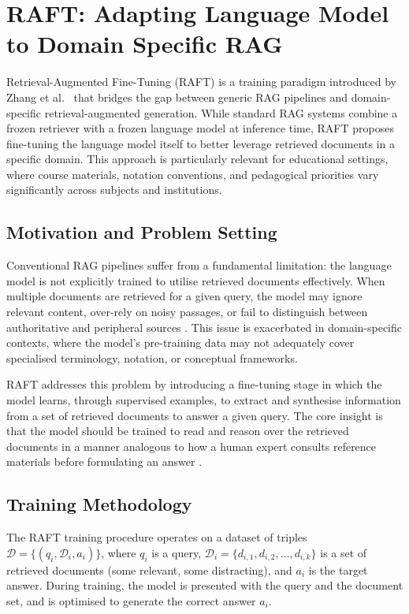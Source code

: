 \section{RAFT: Adapting Language Model to Domain Specific RAG}

Retrieval-Augmented Fine-Tuning (RAFT) is a training paradigm introduced by Zhang et al.\ \cite{zhang2024raftadaptinglanguagemodel} that bridges the gap between generic RAG pipelines and domain-specific retrieval-augmented generation. While standard RAG systems combine a frozen retriever with a frozen language model at inference time, RAFT proposes fine-tuning the language model itself to better leverage retrieved documents in a specific domain. This approach is particularly relevant for educational settings, where course materials, notation conventions, and pedagogical priorities vary significantly across subjects and institutions.

\subsection{Motivation and Problem Setting}

Conventional RAG pipelines suffer from a fundamental limitation: the language model is not explicitly trained to utilise retrieved documents effectively. When multiple documents are retrieved for a given query, the model may ignore relevant content, over-rely on noisy passages, or fail to distinguish between authoritative and peripheral sources \cite{gao2023retrieval}. This issue is exacerbated in domain-specific contexts, where the model's pre-training data may not adequately cover specialised terminology, notation, or conceptual frameworks.

RAFT addresses this problem by introducing a fine-tuning stage in which the model learns, through supervised examples, to extract and synthesise information from a set of retrieved documents to answer a given query. The core insight is that the model should be trained to read and reason over the retrieved documents in a manner analogous to how a human expert consults reference materials before formulating an answer \cite{zhang2024raft}.

\subsection{Training Methodology}

The RAFT training procedure operates on a dataset of triples \(\mathcal{D} = \{(q_i, \mathcal{D}_i, a_i)\}\), where \(q_i\) is a query, \(\mathcal{D}_i = \{d_{i,1}, d_{i,2}, \dots, d_{i,k}\}\) is a set of retrieved documents (some relevant, some distracting), and \(a_i\) is the target answer. During training, the model is presented with the query and the document set, and is optimised to generate the correct answer \(a_i\).

